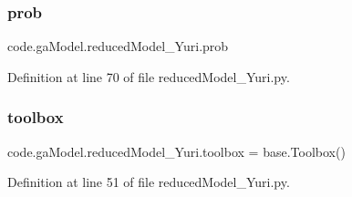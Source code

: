\subsubsection{\texorpdfstring{prob}{prob}}
{\footnotesize\ttfamily code.\+ga\+Model.\+reduced\+Model\+\_\+\+Yuri.\+prob}



Definition at line 70 of file reduced\+Model\+\_\+\+Yuri.\+py.

\mbox{\label{namespacecode_1_1ga_model_1_1reduced_model___yuri_ad9761943e77a96a38cbdeb410b2344aa}} 
\subsubsection{\texorpdfstring{toolbox}{toolbox}}
{\footnotesize\ttfamily code.\+ga\+Model.\+reduced\+Model\+\_\+\+Yuri.\+toolbox = base.\+Toolbox()}



Definition at line 51 of file reduced\+Model\+\_\+\+Yuri.\+py.

